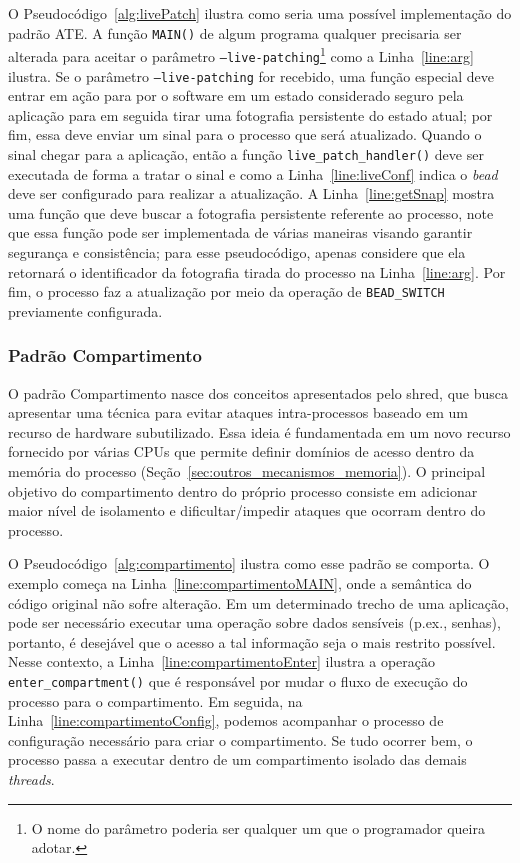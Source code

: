 O Pseudocódigo~\ref{alg:livePatch} ilustra como seria uma possível
implementação do padrão ATE. A função \texttt{MAIN()} de algum programa
qualquer precisaria ser alterada para aceitar o parâmetro
\texttt{--live-patching}\footnote{O nome do parâmetro poderia ser qualquer um
que o programador queira adotar.} como a Linha~\ref{line:arg} ilustra. Se o
parâmetro \texttt{--live-patching} for recebido, uma função especial deve entrar em ação para por o
software em um estado considerado seguro pela aplicação para em seguida tirar
uma fotografia persistente do estado atual; por fim, essa deve enviar um sinal
para o processo que será atualizado. Quando o sinal chegar para a aplicação,
então a função \texttt{live\_patch\_handler()} deve ser executada de forma a
tratar o sinal e como a Linha~\ref{line:liveConf} indica o \emph{bead} deve ser
configurado para realizar a atualização. A Linha~\ref{line:getSnap} mostra uma
função que deve buscar a fotografia persistente referente ao processo, note que
essa função pode ser implementada de várias maneiras visando garantir segurança
e consistência; para esse pseudocódigo, apenas considere que ela retornará o
identificador da fotografia tirada do processo na Linha~\ref{line:arg}. Por
fim, o processo faz a atualização por meio da operação de \texttt{BEAD\_SWITCH}
previamente configurada.

\subsubsection{Padrão Compartimento}

O padrão Compartimento nasce dos conceitos apresentados pelo shred, que busca apresentar uma técnica para evitar ataques intra-processos
baseado em um recurso de hardware subutilizado. Essa ideia é fundamentada em um
novo recurso fornecido por várias CPUs que permite definir domínios de acesso
dentro da memória do processo (Seção~\ref{sec:outros_mecanismos_memoria}). O
principal objetivo do compartimento dentro do próprio processo consiste em
adicionar maior nível de isolamento e dificultar/impedir ataques que ocorram
dentro do processo.



O Pseudocódigo~\ref{alg:compartimento} ilustra como esse padrão se comporta. O
exemplo começa na Linha~\ref{line:compartimentoMAIN}, onde a semântica do
código original não sofre alteração. Em um determinado trecho de uma aplicação,
pode ser necessário executar uma operação sobre dados sensíveis (p.ex., senhas),
portanto, é desejável que o acesso a tal informação seja o mais restrito
possível. Nesse contexto, a Linha~\ref{line:compartimentoEnter} ilustra a
operação \texttt{enter\_compartment()} que é responsável por mudar o fluxo de
execução do processo para o compartimento. Em seguida, na
Linha~\ref{line:compartimentoConfig}, podemos acompanhar o processo de
configuração necessário para criar o compartimento. Se tudo ocorrer bem, o processo passa a executar dentro de
um compartimento isolado das demais \emph{threads}. 

